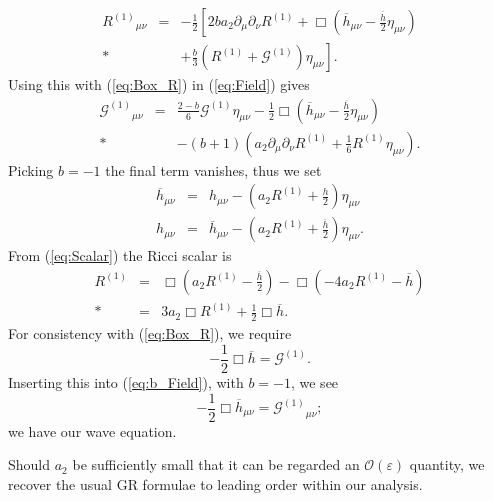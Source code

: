 \documentclass[aps,prd,amsfonts,amssymb,amsmath,nofootinbib,reprint,showpacs]{revtex4-1}
\newcommand{\eqnref}[1]{(\ref{eq:#1})}
\newcommand{\recip}[1]{\ensuremath{\frac{1}{#1}}}
\newcommand{\order}[1]{\ensuremath{\mathcal{O}({#1})}}
\begin{document}
\begin{eqnarray}
{R^{(1)}}_{\mu\nu} & = & -\frac{1}{2}\left[2b a_2 \partial_\mu\partial_\nu R^{(1)} + \Box\left(\overline{h}_{\mu\nu} -\frac{\overline{h}}{2}\eta_{\mu\nu}\right) \right. \nonumber \\*
 & &  +\left . \frac{b}{3}(R^{(1)} + \mathcal{G}^{(1)})\eta_{\mu\nu}\right].
\end{eqnarray}
Using this with \eqnref{Box_R} in \eqnref{Field} gives
\begin{eqnarray}
{\mathcal{G}^{(1)}}_{\mu\nu} & = & \frac{2 - b}{6}\mathcal{G}^{(1)}\eta_{\mu\nu} -\frac{1}{2}\Box\left(\overline{h}_{\mu\nu} - \frac{\overline{h}}{2}\eta_{\mu\nu}\right) \nonumber \\*
 & & - (b + 1)\left(a_2\partial_\mu\partial_\nu R^{(1)} + \recip{6}R^{(1)}\eta_{\mu\nu}\right).
\label{eq:b_Field}
\end{eqnarray}
Picking $b = -1$ the final term vanishes, thus we set~\cite{Corda2007, Capozziello2008}
\begin{subequations}
\begin{eqnarray}
\label{eq:hbar_metric}
\overline{h}_{\mu\nu} & = & h_{\mu\nu} - \left(a_2 R^{(1)} + \frac{h}{2}\right)\eta_{\mu\nu}\\
h_{\mu\nu} & = & \overline{h}_{\mu\nu} - \left(a_2 R^{(1)} + \frac{\overline{h}}{2}\right)\eta_{\mu\nu}.
\label{eq:h_metric}
\end{eqnarray}
\end{subequations}
From \eqnref{Scalar} the Ricci scalar is 
\begin{eqnarray}
R^{(1)} & = & \Box \left(a_2 R^{(1)} -\frac{\overline{h}}{2}\right) - \Box (-4 a_2 R^{(1)} - \overline{h}) \nonumber \\*
 & = & 3a_2 \Box R^{(1)} + \frac{1}{2}\Box \overline{h}.
\label{eq:Ricci_Box_h}
\end{eqnarray}
For consistency with \eqnref{Box_R}, we require
\begin{equation}
-\recip{2}\Box \overline{h} = \mathcal{G}^{(1)}.
\label{eq:Box_h}
\end{equation}
Inserting this into \eqnref{b_Field}, with $b = -1$, we see
\begin{equation}
-\recip{2}\Box \overline{h}_{\mu\nu} = {\mathcal{G}^{(1)}}_{\mu\nu};
\label{eq:Box_hmunu}
\end{equation}
we have our wave equation.

Should $a_2$ be sufficiently small that it can be regarded an $\order{\varepsilon}$ quantity, we recover the usual GR formulae to leading order within our analysis.
\end{document}
